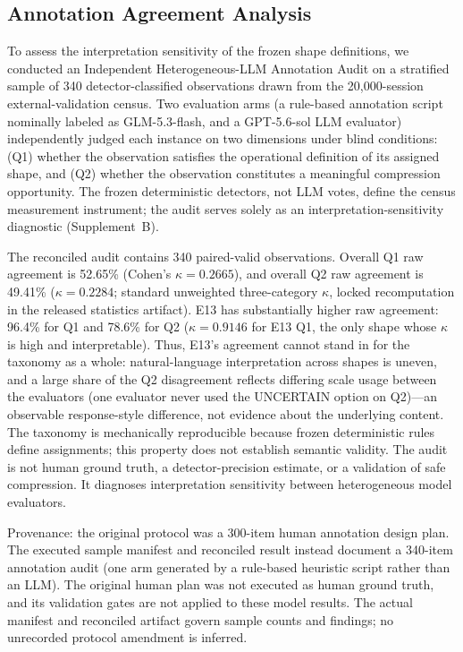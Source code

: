 ﻿\documentclass[sigconf,balance=false]{acmart}
\begin{document}
\subsection{Annotation Agreement Analysis}
\label{sec:annotation}

To assess the interpretation sensitivity of the frozen shape definitions, we conducted an Independent Heterogeneous-LLM Annotation Audit on a stratified sample of 340 detector-classified observations drawn from the 20{,}000-session external-validation census. Two evaluation arms (a rule-based annotation script nominally labeled as GLM-5.3-flash, and a GPT-5.6-sol LLM evaluator) independently judged each instance on two dimensions under blind conditions: (Q1) whether the observation satisfies the operational definition of its assigned shape, and (Q2) whether the observation constitutes a meaningful compression opportunity. The frozen deterministic detectors, not LLM votes, define the census measurement instrument; the audit serves solely as an interpretation-sensitivity diagnostic (Supplement~B).

The reconciled audit contains 340 paired-valid observations. Overall Q1 raw agreement is 52.65\% (Cohen's $\kappa=0.2665$), and overall Q2 raw agreement is 49.41\% ($\kappa=0.2284$; standard unweighted three-category $\kappa$, locked recomputation in the released statistics artifact). E13 has substantially higher raw agreement: 96.4\% for Q1 and 78.6\% for Q2 ($\kappa=0.9146$ for E13 Q1, the only shape whose $\kappa$ is high and interpretable). Thus, E13's agreement cannot stand in for the taxonomy as a whole: natural-language interpretation across shapes is uneven, and a large share of the Q2 disagreement reflects differing scale usage between the evaluators (one evaluator never used the UNCERTAIN option on Q2)---an observable response-style difference, not evidence about the underlying content. The taxonomy is mechanically reproducible because frozen deterministic rules define assignments; this property does not establish semantic validity. The audit is not human ground truth, a detector-precision estimate, or a validation of safe compression. It diagnoses interpretation sensitivity between heterogeneous model evaluators.

Provenance: the original protocol was a 300-item human annotation design plan. The executed sample manifest and reconciled result instead document a 340-item annotation audit (one arm generated by a rule-based heuristic script rather than an LLM). The original human plan was not executed as human ground truth, and its validation gates are not applied to these model results. The actual manifest and reconciled artifact govern sample counts and findings; no unrecorded protocol amendment is inferred.
\end{document}

